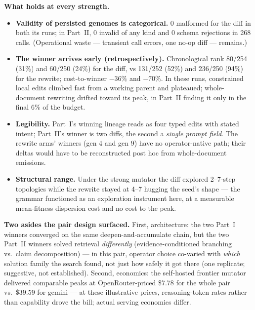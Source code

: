 \documentclass[11pt]{article}
\begin{document}
\medskip\noindent\textbf{What holds at every strength.}
\begin{itemize}
  \item \textbf{Validity of persisted genomes is categorical.} 0 malformed for the diff in both
  its runs; in Part~II, 0 invalid of any kind and 0 schema rejections in 268 calls.
  (Operational waste --- transient call errors, one no-op diff --- remains.)
  \item \textbf{The winner arrives early (retrospectively).} Chronological rank 80/254 (31\%)
  and 60/250 (24\%) for the diff, vs 131/252 (52\%) and 236/250 (94\%) for the rewrite;
  cost-to-winner \textbf{$-36\%$} and \textbf{$-70\%$}. In these runs, constrained local edits
  climbed fast from a working parent and plateaued; whole-document rewriting drifted toward its
  peak, in Part~II finding it only in the final 6\% of the budget.
  \item \textbf{Legibility.} Part~I's winning lineage reads as four typed edits with stated
  intent; Part~II's winner is two diffs, the second a \emph{single prompt field}. The rewrite
  arms' winners (gen 4 and gen 9) have no operator-native path; their deltas would have to be
  reconstructed post hoc from whole-document emissions.
  \item \textbf{Structural range.} Under the strong mutator the diff explored 2--7-step
  topologies while the rewrite stayed at 4--7 hugging the seed's shape --- the grammar
  functioned as an exploration instrument here, at a measurable mean-fitness dispersion cost and
  no cost to the peak.
\end{itemize}

\medskip\noindent\textbf{Two asides the pair design surfaced.} First, architecture: the two
Part~I winners converged on the same deepen-and-accumulate chain, but the two Part~II winners
solved retrieval \emph{differently} (evidence-conditioned branching vs.\ claim decomposition) ---
in this pair, operator choice co-varied with \emph{which} solution family the search found, not
just how safely it got there (one replicate; suggestive, not established). Second, economics: the self-hosted frontier mutator delivered
comparable peaks at OpenRouter-priced \$7.78 for the whole pair vs.\ \$39.59 for gemini ---
at these illustrative prices, reasoning-token rates rather than capability drove the bill;
actual serving economics differ.
\end{document}
